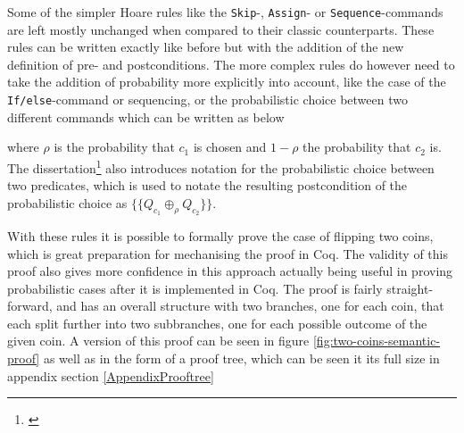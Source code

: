 Some of the simpler Hoare rules like the \texttt{Skip}-, \texttt{Assign}- or \texttt{Sequence}-commands are left mostly unchanged when compared to their classic counterparts. These rules can be written exactly like before but with the addition of the new definition of pre- and postconditions. The more complex rules do however need to take the addition of probability more explicitly into account, like the case of the \texttt{If/else}-command or sequencing, or the probabilistic choice between two different commands which can be written as below 

\begin{center}\label{hoarerule-prob}
    \begin{prooftree}
    \end{prooftree}   
\end{center}

where $\rho$ is the probability that $c_1$ is chosen and $1-\rho$ the probability that $c_2$ is. 
The dissertation\footnote{\textcite{PHdProbExtensions}} also introduces notation for the probabilistic choice between two predicates, which is used to notate the resulting postcondition of the probabilistic choice as $\{\{Q_{c_1} \oplus_\rho Q_{c_2}\}\}$.


With these rules it is possible to formally prove the case of flipping two coins, which is great preparation for mechanising the proof in Coq. The validity of this proof also gives more confidence in this approach actually being useful in proving probabilistic cases after it is implemented in Coq. The proof is fairly straight-forward, and has an overall structure with two branches, one for each coin, that each split further into two subbranches, one for each possible outcome of the given coin. A version of this proof can be seen in figure \ref{fig:two-coins-semantic-proof} as well as in the form of a proof tree, which can be seen it its full size in appendix section \ref{AppendixProoftree}

